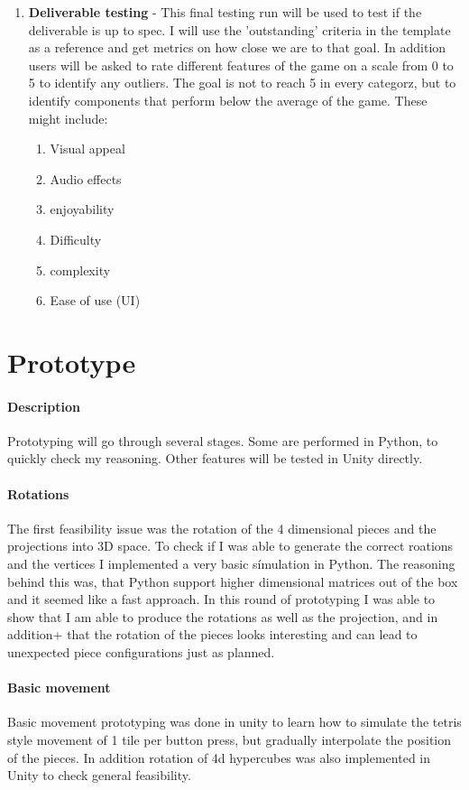 \documentclass{article}
\begin{document}
\begin{enumerate}
    \item \textbf{Deliverable testing} - This final testing run will be used to test if the deliverable is up to spec. I will use the 'outstanding' criteria in the template as a reference and get metrics on how close we are to that goal. In addition users will be asked to rate different features of the game on a scale from 0 to 5 to identify any outliers. The goal is not to reach 5 in every categorz, but to identify components that perform below the average of the game. These might include:
            \begin{enumerate}
                \item Visual appeal
                \item Audio effects
                \item enjoyability
                \item Difficulty
                \item complexity
                \item Ease of use (UI)
            \end{enumerate}

    
\end{enumerate}

\section{Prototype}
\paragraph{Description}
Prototyping will go through several stages. Some are performed in Python, to quickly check my reasoning. Other features will be tested in Unity directly.
\paragraph{Rotations}
The first feasibility issue was the rotation of the 4 dimensional pieces and the projections into 3D space. To check if I was able to generate the correct roations and the vertices I implemented a very basic símulation in Python. The reasoning
behind this was, that Python support higher dimensional matrices out of the box and it seemed like a fast approach. In this round of prototyping I was able to show that I am able to produce the rotations as well as the projection, and in addition+
that the rotation of the pieces looks interesting and can lead to unexpected piece configurations just as planned.
\paragraph{Basic movement}
Basic movement prototyping was done in unity to learn how to simulate the tetris style movement of 1 tile per button press, but gradually interpolate the position of the pieces.
In addition rotation of 4d hypercubes was also implemented in Unity to check general feasibility.
\end{document}

